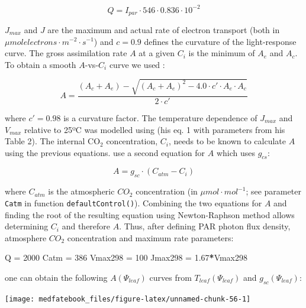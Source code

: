 \documentclass[]{book}
\newenvironment{Shaded}{\begin{snugshade}}{\end{snugshade}}
\newcommand{\DecValTok}[1]{\textcolor[rgb]{0.00,0.00,0.81}{#1}}
\newcommand{\FloatTok}[1]{\textcolor[rgb]{0.00,0.00,0.81}{#1}}
\newcommand{\StringTok}[1]{\textcolor[rgb]{0.31,0.60,0.02}{#1}}
\newcommand{\OperatorTok}[1]{\textcolor[rgb]{0.81,0.36,0.00}{\textbf{#1}}}
\newcommand{\NormalTok}[1]{#1}
\begin{document}
\begin{equation}
Q = I_{par}\cdot 546 \cdot 0.836\cdot 10^{-2}
\end{equation}

\(J_{max}\) and \(J\) are the maximum and actual rate of electron
transport (both in \(\mu mol electrons \cdot m^{-2} \cdot s^{-1}\)) and
\(c=0.9\) defines the curvature of the light-response curve. The gross
assimilation rate \(A\) at a given \(C_i\) is the minimum of \(A_e\) and
\(A_c\). To obtain a smooth \(A\)-vs-\(C_i\) curve we used
\citep{Collatz1991}:

\begin{equation}
A = \frac{(A_c+A_e)-\sqrt{(A_c+A_e)^2-4.0\cdot c'\cdot A_e\cdot A_c}}{2\cdot c'}
\end{equation}

where \(c'=0.98\) is a curvature factor. The temperature dependence of
\(J_{max}\) and \(V_{max}\) relative to 25ºC was modelled using
\citet{Leuning2002} (his eq. 1 with parameters from his Table 2). The
internal CO\(_2\) concentration, \(C_i\), needs to be known to calculate
\(A\) using the previous equations. \citet{Sperry2016a} use a second
equation for \(A\) which uses \(g_{cs}\):

\begin{equation}
A = g_{sc} \cdot (C_{atm}-C_i)
\end{equation}

where \(C_{atm}\) is the atmospheric \(CO_{2}\) concentration (in
\(\mu mol \cdot mol^{-1}\); see parameter \texttt{Catm} in function
\texttt{defaultControl()}). Combining the two equations for \(A\) and
finding the root of the resulting equation using Newton-Raphson method
allows determining \(C_i\) and therefore \(A\). Thus, after defining PAR
photon flux density, atmosphere \(CO_{2}\) concentration and maximum
rate parameters:

\begin{Shaded}
\begin{Highlighting}[]
\NormalTok{Q =}\StringTok{ }\DecValTok{2000}
\NormalTok{Catm =}\StringTok{ }\DecValTok{386}
\NormalTok{Vmax298 =}\StringTok{ }\DecValTok{100}
\NormalTok{Jmax298 =}\StringTok{ }\FloatTok{1.67}\OperatorTok{*}\NormalTok{Vmax298}
\end{Highlighting}
\end{Shaded}

one can obtain the following \(A(\Psi_{leaf})\) curves from
\(T_{leaf}(\Psi_{leaf})\) and \(g_{sc}(\Psi_{leaf})\):

\begin{center}\texttt{[image: medfatebook\_files/figure-latex/unnamed-chunk-56-1]} \end{center}
\end{document}
